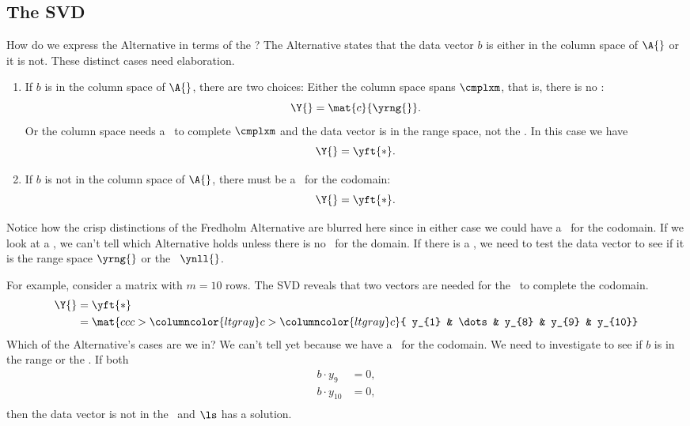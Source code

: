 \subsection{The SVD}
How do we express the Alternative in terms of the \svdl? The Alternative states that the data vector $b$ is either in the column space of $\A{}$ or it is not. These distinct cases need elaboration.
\begin{enumerate}
\item If $b$ is in the column space of $\A{}$, there are two choices:
\subitem Either the column space spans $\cmplxm$, that is, there is no \ns:
\begin{equation*}
  \Y{} = \mat{c}{ \yrng{} }.
\end{equation*}
\subitem Or the column space needs a \ns\ to complete $\cmplxm$ and the data vector is in the range space, not the \ns. In this case we have
\begin{equation*}
  \Y{} = \yft{*}.
\end{equation*}
\item If $b$ is not in the column space of $\A{}$, there must be a \ns\ for the codomain:
\begin{equation*}
  \Y{} = \yft{*}.
\end{equation*}
\end{enumerate}
Notice how the crisp distinctions of the Fredholm Alternative are blurred here since in either case we could have a \ns\ for the codomain. If we look at a \svdl, we can't tell which Alternative holds unless there is no \ns\ for the domain. If there is a \ns, we need to test the data vector to see if it is the range space $\yrng{}$ or the \ns\ $\ynll{}$.

For example, consider a matrix with $m=10$ rows. The SVD reveals that two vectors are needed for the \ns\ to complete the codomain.
\begin{equation}
  \begin{split}
     \Y{} &= \yft{*} \\
     &= \mat{ccc>{\columncolor{ltgray}}c>{\columncolor{ltgray}}c}{ y_{1} & \dots & y_{8} & y_{9} & y_{10}}
  \end{split}
\end{equation}
Which of the Alternative's cases are we in? We can't tell yet because we have a \ns\ for the codomain. We need to investigate to see if $b$ is in the range or the \ns. If both
\begin{equation}
  \begin{split}
     b\cdot y_{9}  &=0, \\
     b\cdot y_{10} &=0, \\
  \end{split}
\end{equation}
then the data vector is not in the \ns\ and $\ls$ has a solution.

